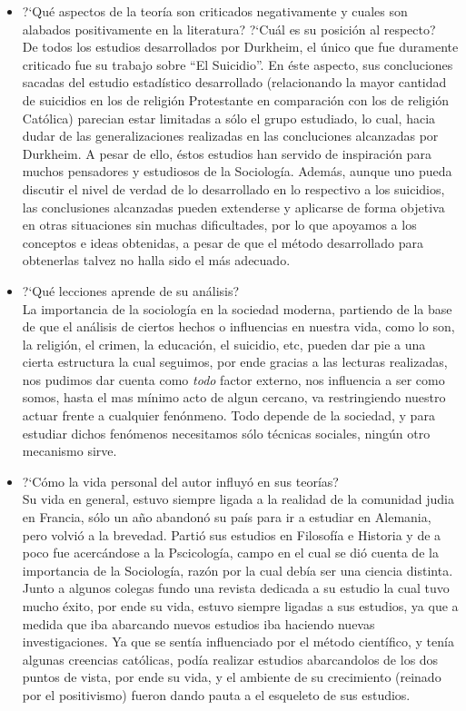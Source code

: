 \begin{itemize}
	\item ?`Qu\'e aspectos de la teor\'ia son criticados negativamente y cuales son alabados positivamente en la literatura? ?`Cu\'al es su posici\'on al respecto?\\
	De todos los estudios desarrollados por Durkheim, el \'unico que fue duramente criticado fue su trabajo sobre ``El Suicidio''. En \'este aspecto, sus concluciones sacadas del 
	estudio estad\'istico desarrollado (relacionando la mayor cantidad de suicidios en los de religi\'on Protestante en comparaci\'on con los de religi\'on Cat\'olica) 
	parecian estar limitadas a s\'olo el grupo estudiado, lo cual, hacia dudar de las generalizaciones realizadas en las concluciones alcanzadas por Durkheim. A pesar de ello,
	\'estos estudios han servido de inspiraci\'on para muchos pensadores y estudiosos de la Sociolog\'ia. Adem\'as, aunque uno pueda discutir el nivel de verdad de lo desarrollado 
	en lo respectivo a los suicidios, las conclusiones alcanzadas pueden extenderse y aplicarse de forma objetiva en otras situaciones sin muchas dificultades, por lo que 
	apoyamos a los conceptos e ideas obtenidas, a pesar de que el m\'etodo desarrollado para obtenerlas talvez no halla sido el m\'as adecuado.

	\item ?`Qu\'e lecciones aprende de su an\'alisis?\\
	La importancia de la sociolog\'ia en la sociedad moderna, partiendo de la base de que el an\'alisis de ciertos hechos o influencias en nuestra vida, como lo son,
	la religi\'on, el crimen, la educaci\'on, el suicidio, etc, pueden dar pie a una cierta estructura la cual seguimos, por ende gracias a las lecturas realizadas,
	nos pudimos dar cuenta como \emph{todo} factor externo, nos influencia a ser como somos, hasta el mas m\'inimo acto de algun cercano, va restringiendo nuestro
	actuar frente a cualquier fen\'onmeno. Todo depende de la sociedad, y para estudiar dichos fen\'omenos necesitamos s\'olo t\'ecnicas sociales, ning\'un otro
	mecanismo sirve.

	\item ?`C\'omo la vida personal del autor influy\'o en sus teor\'ias?\\
	Su vida en general, estuvo siempre ligada a la realidad de la comunidad judia en Francia, s\'olo un a\~no abandon\'o su pa\'is para ir a estudiar en Alemania, pero
	volvi\'o a la brevedad. Parti\'o sus estudios en Filosof\'ia e Historia y de a poco fue acerc\'andose a la Pscicolog\'ia, campo en el cual se di\'o cuenta de la
	importancia de la Sociolog\'ia, raz\'on por la cual deb\'ia ser una ciencia distinta. Junto a algunos colegas fundo una revista dedicada a su estudio la cual tuvo
	mucho \'exito, por ende su vida, estuvo siempre ligadas a sus estudios, ya que a medida que iba abarcando nuevos estudios iba haciendo nuevas investigaciones.
	Ya que se sent\'ia influenciado por el m\'etodo cient\'ifico, y ten\'ia algunas creencias cat\'olicas, pod\'ia realizar estudios abarcandolos de los dos puntos de
	vista, por ende su vida, y el ambiente de su crecimiento (reinado por el positivismo) fueron dando pauta a el esqueleto de sus estudios.


\end{itemize}

